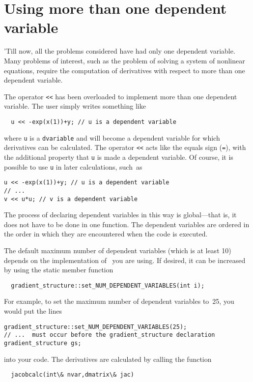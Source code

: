 \documentclass{admbmanual}
\begin{document}
\section{Using more than one dependent variable}

'Till now, all the problems considered have had only one dependent variable.
Many problems of interest, such as the problem of solving a system of nonlinear
equations, require the computation of derivatives with respect to more than one
dependent variable.

The operator \texttt{<{}<} has been overloaded to implement more than one
dependent variable. The user simply writes something like
\begin{lstlisting}
  u << -exp(x(1))+y; // u is a dependent variable
\end{lstlisting}
where \texttt{u} is a \texttt{dvariable} and will become a dependent variable
for which derivatives can be calculated. The operator \texttt{<{}<} acts like
the equals sign (\texttt{=}), with the additional property that \texttt{u} is
made a dependent variable. Of course, it is possible to use \texttt{u} in later
calculations, such~as
\begin{lstlisting}
u << -exp(x(1))+y; // u is a dependent variable
// ...
v << u*u; // v is a dependent variable
\end{lstlisting}

The process of declaring dependent variables in this way is global---that is, it
does not have to be done in one function. The dependent variables are ordered in
the order in which they are encountered when the code is executed.

The default maximum number of dependent variables (which is at least 10) depends
on the implementation of \scAD\ you are using. If desired, it can be increased
by using the static member function
\begin{lstlisting}
  gradient_structure::set_NUM_DEPENDENT_VARIABLES(int i);
\end{lstlisting}

For example, to set the maximum number of dependent variables to~25, you would
put the lines
\begin{lstlisting}
gradient_structure::set_NUM_DEPENDENT_VARIABLES(25);
// ...  must occur before the gradient_structure declaration
gradient_structure gs;
\end{lstlisting}
into your code. The derivatives are calculated by calling the function
\begin{lstlisting}
  jacobcalc(int\& nvar,dmatrix\& jac)
\end{lstlisting}
\end{document}
